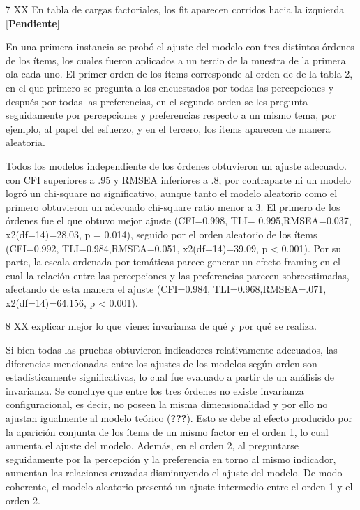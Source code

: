 \documentclass[
]{article}
\begin{document}
7 XX En tabla de cargas factoriales, los fit aparecen corridos hacia la
izquierda {[}\textbf{Pendiente}{]}

En una primera instancia se probó el ajuste del modelo con tres
distintos órdenes de los ítems, los cuales fueron aplicados a un tercio
de la muestra de la primera ola cada uno. El primer orden de los ítems
corresponde al orden de de la tabla 2, en el que primero se pregunta a
los encuestados por todas las percepciones y después por todas las
preferencias, en el segundo orden se les pregunta seguidamente por
percepciones y preferencias respecto a un mismo tema, por ejemplo, al
papel del esfuerzo, y en el tercero, los ítems aparecen de manera
aleatoria.

Todos los modelos independiente de los órdenes obtuvieron un ajuste
adecuado. con CFI superiores a .95 y RMSEA inferiores a .8, por
contraparte ni un modelo logró un chi-square no significativo, aunque
tanto el modelo aleatorio como el primero obtuvieron un adecuado
chi-square ratio menor a 3. El primero de los órdenes fue el que obtuvo
mejor ajuste (CFI=0.998, TLI= 0.995,RMSEA=0.037, x2(df=14)=28,03, p =
0.014), seguido por el orden aleatorio de los ítems (CFI=0.992,
TLI=0.984,RMSEA=0.051, x2(df=14)=39.09, p \textless{} 0.001). Por su
parte, la escala ordenada por temáticas parece generar un efecto framing
en el cual la relación entre las percepciones y las preferencias parecen
sobreestimadas, afectando de esta manera el ajuste (CFI=0.984,
TLI=0.968,RMSEA=.071, x2(df=14)=64.156, p \textless{} 0.001).

8 XX explicar mejor lo que viene: invarianza de qué y por qué se
realiza.

Si bien todas las pruebas obtuvieron indicadores relativamente
adecuados, las diferencias mencionadas entre los ajustes de los modelos
según orden son estadísticamente significativas, lo cual fue evaluado a
partir de un análisis de invarianza. Se concluye que entre los tres
órdenes no existe invarianza configuracional, es decir, no poseen la
misma dimensionalidad y por ello no ajustan igualmente al modelo teórico
({\textbf{???}}). Esto se debe al efecto producido por la aparición
conjunta de los ítems de un mismo factor en el orden 1, lo cual aumenta
el ajuste del modelo. Además, en el orden 2, al preguntarse seguidamente
por la percepción y la preferencia en torno al mismo indicador, aumentan
las relaciones cruzadas disminuyendo el ajuste del modelo. De modo
coherente, el modelo aleatorio presentó un ajuste intermedio entre el
orden 1 y el orden 2.
\end{document}
